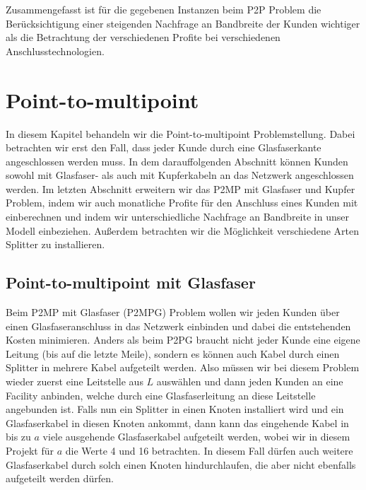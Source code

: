 \documentclass[11pt,a4paper]{article}
\theoremstyle{my_th_style1}
\begin{document}
Zusammengefasst ist f\"ur die gegebenen Instanzen beim P2P Problem die Ber\"ucksichtigung einer steigenden Nachfrage an Bandbreite der Kunden wichtiger als die Betrachtung der verschiedenen Profite bei verschiedenen Anschlusstechnologien.

\section{Point-to-multipoint}
In diesem Kapitel behandeln wir die Point-to-multipoint Problemstellung.  Dabei betrachten wir erst den Fall, dass jeder Kunde durch eine Glasfaserkante angeschlossen werden muss. In dem darauffolgenden Abschnitt k\"onnen Kunden sowohl mit Glasfaser- als auch mit Kupferkabeln an das Netzwerk angeschlossen werden. Im letzten Abschnitt erweitern wir das P2MP mit Glasfaser und Kupfer Problem, indem wir auch monatliche Profite f\"ur den Anschluss eines Kunden mit einberechnen und indem wir unterschiedliche Nachfrage an Bandbreite in unser Modell einbeziehen. Außerdem betrachten wir die Möglichkeit verschiedene Arten Splitter zu installieren.

 
\subsection{Point-to-multipoint mit Glasfaser}
\label{section_p2mpg} 
 
Beim P2MP mit Glasfaser (P2MPG) Problem wollen wir jeden Kunden \"uber einen Glasfaseranschluss in das Netzwerk einbinden und dabei die entstehenden Kosten minimieren.
Anders als beim P2PG braucht nicht jeder Kunde eine eigene Leitung (bis auf die letzte Meile), sondern es k\"onnen auch Kabel durch einen Splitter in mehrere Kabel aufgeteilt werden.
Also m\"ussen wir bei diesem Problem wieder zuerst eine Leitstelle aus $L$ ausw\"ahlen und dann jeden Kunden an eine Facility anbinden, welche durch eine Glasfaserleitung an diese Leitstelle angebunden ist.
Falls nun ein Splitter in einen Knoten installiert wird und ein Glasfaserkabel in diesen Knoten ankommt, dann kann das eingehende Kabel in bis zu $a$ viele ausgehende Glasfaserkabel aufgeteilt werden, wobei wir in diesem Projekt f\"ur $a$ die Werte 4 und 16 betrachten.
In diesem Fall d\"urfen auch weitere Glasfaserkabel durch solch einen Knoten hindurchlaufen, die aber nicht ebenfalls aufgeteilt werden d\"urfen.
\end{document}
